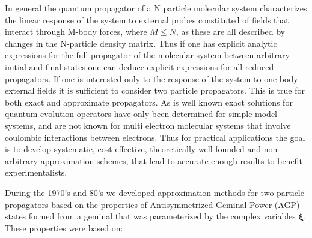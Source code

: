\documentclass[aps,preprint]{revtex4}%
\begin{document}
In general the quantum propagator of a N particle molecular system
characterizes the linear response of the system to external probes constituted
of fields that interact through M-body forces, where $M\leq N$, as these are
all described by changes in the N-particle density matrix. Thus if one has
explicit analytic expressions for the full propagator of the molecular system
between arbitrary initial and final states one can deduce explicit expressions
for all reduced propagators. If one is interested only to the response of the
system to one body external fields it is sufficient to consider two particle
propagators. This is true for both exact and approximate propagators. As is
well known exact solutions for quantum evolution operators have only been
determined for simple model systems, and are not known for multi electron
molecular systems that involve coulombic interactions between electrons. Thus
for practical applications the goal is to develop systematic, cost effective,
theoretically well founded and non arbitrary approximation schemes, that lead
to accurate enough results to benefit experimentalists.

During the 1970's and 80's we developed approximation methods for two particle
propagators based on the properties of Antisymmetrized Geminal Power (AGP)
states formed from a geminal that was parameterized by the complex variables
$\mathbf{\xi}$. These properties were based on:
\end{document}
